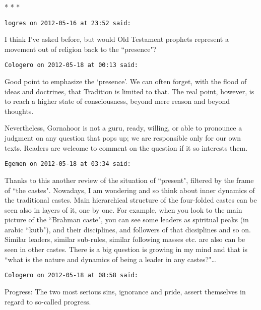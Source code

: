 \hfill




\begin{center}* * *\end{center}

\begin{footnotesize}\begin{sffamily}



\texttt{logres on 2012-05-16 at 23:52 said: }

I think I've asked before, but would Old Testament prophets represent a movement out of religion back to the ``presence"?


\hfill

\texttt{Cologero on 2012-05-18 at 00:13 said: }

Good point to emphasize the `presence'. We can often forget, with the flood of ideas and doctrines, that Tradition is limited to that. The real point, however, is to reach a higher state of consciousness, beyond mere reason and beyond thoughts.

Nevertheless, Gornahoor is not a guru, ready, willing, or able to pronounce a judgment on any question that pops up; we are responsible only for our own texts. Readers are welcome to comment on the question if it so interests them.


\hfill

\texttt{Egemen on 2012-05-18 at 03:34 said: }

Thanks to this another review of the situation of ``present", filtered by the frame of ``the castes". Nowadays, I am wondering and so think about inner dynamics of the traditional castes. Main hierarchical structure of the four-folded castes can be seen also in layers of it, one by one. For example, when you look to the main picture of the ``Brahman caste", you can see some leaders as spiritual peaks (in arabic ``kutb"), and their disciplines, and followers of that dicsiplines and so on. Similar leaders, similar sub-rules, similar following masses etc. are also can be seen in other castes. There is a big question is growing in my mind and that is ``what is the nature and dynamics of being a leader in any castes?"…


\hfill

\texttt{Cologero on 2012-05-18 at 08:58 said: }

Progress: The two most serious sins, ignorance and pride, assert themselves in regard to so-called progress.


\end{sffamily}
\end{footnotesize}
